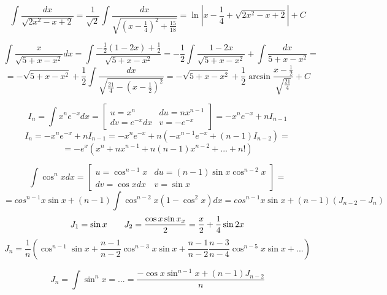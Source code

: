 \documentclass[main]{subfiles}
\begin{document}
    \begin{Example}
        \[\int \frac{dx}{\sqrt{2x^2 - x + 2}} = \frac{1}{\sqrt{2}} \int \frac{dx}{\sqrt{(x-\frac{1}{4})^2 + \frac{15}{18}}} = \ln|x-\frac{1}{4}+\sqrt{2x^2-x+2}|+C\]
    \end{Example}

    \begin{Example}
        \[\int \frac{x}{\sqrt{5+x-x^2}} dx = \int \frac{-\frac{1}{2}(1-2x)+\frac{1}{2}}{\sqrt{5+x-x^2}} = -\frac{1}{2} \int \frac{1-2x}{\sqrt{5+x-x^2}} + \int \frac{dx}{5+x-x^2} = \]
        \[=-\sqrt{5+x-x^2} + \frac{1}{2} \int \frac{dx}{\sqrt{\frac{21}{4} - (x-\frac{1}{2})^2}} =-\sqrt{5+x-x^2} + \frac{1}{2} \arcsin \frac{x-\frac{1}{2}}{\sqrt{\frac{21}{4}}} + C\]
    \end{Example}

    \begin{Example}
        \[I_n = \int x^n e^{-x} dx = \left[\begin{matrix}
            u = x^n & du = n x^{n-1}\\
            dv = e^{-x} dx & v = -e^{-x}
        \end{matrix}\right] = -x^n e^{-x} + n I_{n-1}\]
        \[I_n = -x^n e^{-x} + n I_{n-1} = -x^n e^{-x} + n (-x^{n-1} e^{-x} + (n-1) I_{n-2}) =\]
        \[= -e^x (x^n + n x^{n-1} + n(n-1) x^{n-2} + ...+ n!)\]
    \end{Example}

    \begin{Example}
        \[\int \cos^n x dx = \left[\begin{matrix}
            u = \cos^{n-1} x & du = (n-1)\sin x \cos^{n-2} x\\
            dv = \cos x dx & v = \sin x
        \end{matrix}\right] = \]
        \[= cos^{n-1} x \sin x + (n-1) \int \cos^{n-2} x (1-\cos^2 x) dx = cos^{n-1} x \sin x + (n-1) (J_{n-2} - J_n)\]
        \[J_1 = \sin x \qquad J_2= \frac{\cos x \sin x _ x}{2} = \frac{x}{2} + \frac{1}{4} \sin 2x\]
        \[J_n = \frac{1}{n} (\cos^{n-1} \sin x + \frac{n-1}{n-2} \cos^{n-3} x \sin x + \frac{n-1}{n-2} \frac{n-3}{n-4} \cos^{n-5} x \sin x + ...)\]
    \end{Example}

    \begin{Example}
        \[J_n = \int \sin^n x = ... = \frac{-\cos x \sin^{n-1} x + (n-1)J_{n-2}}{n}\]
    \end{Example}
\end{document}
